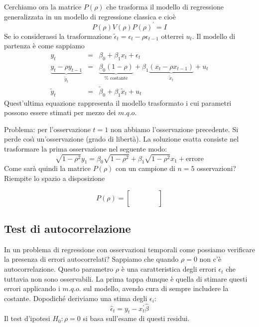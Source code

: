 \documentclass[a4paper]{report}
\newcounter{ese}
\theoremstyle{remark}
\begin{document}
Cerchiamo ora la matrice $P(\rho )$ che trasforma il modello di regressione
generalizzata in un modello di regressione classica e cio\`{e} 
\begin{equation*}
P(\rho )V(\rho )P(\rho )^{\prime }=I
\end{equation*}%
Se io considerassi la trasformazione $\tilde{\epsilon}_{t}=\epsilon
_{t}-\rho \epsilon _{t-1}$ otterrei $u_{t}$. Il modello di partenza \`{e}
come sappiamo 
\begin{eqnarray*}
y_{t} &=&\beta _{0}+\beta _{1}x_{t}+\epsilon _{t} \\
\underset{\tilde{y}_{t}}{\underbrace{y_{t}-\rho y_{t-1}}} &=&\underset{\text{%
costante}}{\underbrace{\beta _{0}(1-\rho )}}+\beta _{1}\underset{\tilde{x}%
_{t}}{\underbrace{(x_{t}-\rho x_{t-1})}}+u_{t} \\
\tilde{y}_{t} &=&\tilde{\beta}_{0}+\beta _{1}\tilde{x}_{t}+u_{t}
\end{eqnarray*}%
Quest'ultima equazione rappresenta il modello trasformato i cui parametri
possono essere stimati per mezzo dei $m.q.o$.

Problema: per l'osservazione $t=1$ non abbiamo l'osservazione precedente. Si
perde cos\`{\i} un'osservazione (grado di libert\`{a}). La soluzione esatta
consiste nel trasformare la prima osservazione nel seguente modo: 
\begin{equation*}
\sqrt{1-\rho ^{2}}y_{1}=\beta _{0}\sqrt{1-\rho ^{2}}+\beta _{1}\sqrt{1-\rho
^{2}}x_{1}+\text{errore}
\end{equation*}%
Come sar\`{a} quindi la matrice $P(\rho )$ con un campione di $n=5$
osservazioni? Riempite lo spazio a disposizione

\begin{equation*}
P(\rho )=\left[ 
\begin{array}{ccccc}
&  &  &  &  \\ 
&  &  &  &  \\ 
&  &  &  &  \\ 
&  &  &  &  \\ 
&  &  &  & 
\end{array}%
\right]
\end{equation*}

\subsection{Test di autocorrelazione}

In un problema di regressione con osservazioni temporali come possiamo
verificare la presenza di errori autocorrelati? Sappiamo che quando $\rho =0$
non c'\`{e} autocorrelazione. Questo parametro $\rho $ \`{e} una
caratteristica degli errori $\epsilon _{t}$ che tuttavia non sono
osservabili. La prima tappa dunque \`{e} quella di stimare questi errori
applicando i $m.q.o.$ sul modello, avendo cura di sempre includere la
costante. Dopodich\'{e} deriviamo una stima degli $\epsilon _{i}$: 
\begin{equation*}
\hat{\epsilon}_{t}=y_{t}-x_{t}^{\prime }\hat{\beta}
\end{equation*}%
Il test d'ipotesi $H_{0}:\rho =0$ si basa sull'esame di questi residui.
\end{document}
